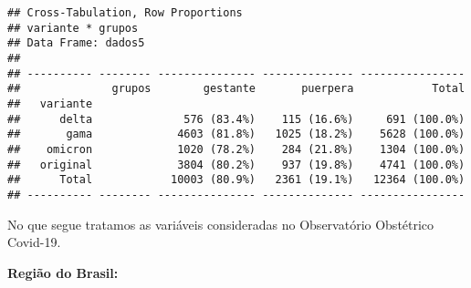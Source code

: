 \documentclass[
]{article}
\newenvironment{Shaded}{\begin{snugshade}}{\end{snugshade}}
\newcommand{\AttributeTok}[1]{\textcolor[rgb]{0.77,0.63,0.00}{#1}}
\newcommand{\ConstantTok}[1]{\textcolor[rgb]{0.00,0.00,0.00}{#1}}
\newcommand{\DecValTok}[1]{\textcolor[rgb]{0.00,0.00,0.81}{#1}}
\newcommand{\FunctionTok}[1]{\textcolor[rgb]{0.00,0.00,0.00}{#1}}
\newcommand{\NormalTok}[1]{#1}
\newcommand{\OtherTok}[1]{\textcolor[rgb]{0.56,0.35,0.01}{#1}}
\newcommand{\SpecialCharTok}[1]{\textcolor[rgb]{0.00,0.00,0.00}{#1}}
\newcommand{\StringTok}[1]{\textcolor[rgb]{0.31,0.60,0.02}{#1}}
\begin{document}
\begin{Shaded}
\end{Shaded}

\begin{verbatim}
## Cross-Tabulation, Row Proportions  
## variante * grupos  
## Data Frame: dados5  
## 
## ---------- -------- --------------- -------------- ----------------
##              grupos        gestante       puerpera            Total
##   variante                                                         
##      delta              576 (83.4%)    115 (16.6%)     691 (100.0%)
##       gama             4603 (81.8%)   1025 (18.2%)    5628 (100.0%)
##    omicron             1020 (78.2%)    284 (21.8%)    1304 (100.0%)
##   original             3804 (80.2%)    937 (19.8%)    4741 (100.0%)
##      Total            10003 (80.9%)   2361 (19.1%)   12364 (100.0%)
## ---------- -------- --------------- -------------- ----------------
\end{verbatim}

No que segue tratamos as variáveis consideradas no Observatório
Obstétrico Covid-19.

\textbf{Região do Brasil:}
\end{document}
